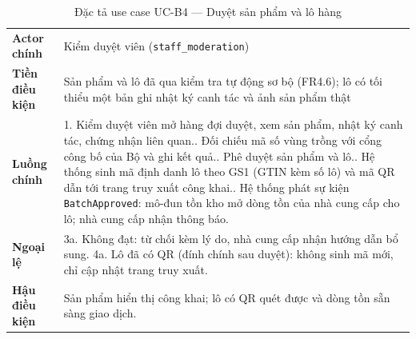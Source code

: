 \begingroup
\tblsetup
\begin{longtable}{L{3.00cm} L{12.25cm}}
\caption{Đặc tả use case UC-B4 --- Duyệt sản phẩm và lô hàng}
\label{tab:uc-b4} \\
\toprule
{}
 \\
\midrule
\endfirsthead
\bottomrule
\endfoot
\textbf{Actor chính} & Kiểm duyệt viên (\texttt{staff\_moderation}) \\
\textbf{Tiền điều kiện} & Sản phẩm và lô đã qua kiểm tra tự động sơ bộ (FR4.6); lô có tối thiểu một bản ghi nhật ký canh tác và ảnh sản phẩm thật \\
\textbf{Luồng chính} &
1. Kiểm duyệt viên mở hàng đợi duyệt, xem sản phẩm, nhật ký canh tác, chứng nhận liên quan.. Đối chiếu mã số vùng trồng với cổng công bố của Bộ và ghi kết quả.. Phê duyệt sản phẩm và lô.. Hệ thống sinh mã định danh lô theo GS1 (GTIN kèm số lô) và mã QR dẫn tới trang truy xuất công khai.. Hệ thống phát sự kiện \texttt{BatchApproved}: mô-đun tồn kho mở dòng tồn của nhà cung cấp cho lô; nhà cung cấp nhận thông báo. \\
\textbf{Ngoại lệ} & 3a. Không đạt: từ chối kèm lý do, nhà cung cấp nhận hướng dẫn bổ sung. 4a. Lô đã có QR (đính chính sau duyệt): không sinh mã mới, chỉ cập nhật trang truy xuất. \\
\textbf{Hậu điều kiện} & Sản phẩm hiển thị công khai; lô có QR quét được và dòng tồn sẵn sàng giao dịch. \\
\end{longtable}
\endgroup

